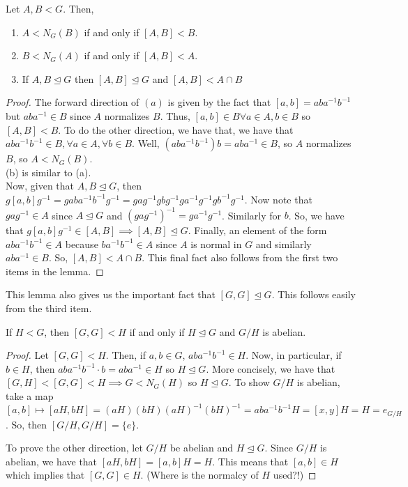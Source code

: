 \documentclass[11pt,leqno,oneside]{amsart}
\newcommand{\subgroup}{\mathrel{<}}
\newcommand{\normsubgroup}{\mathrel{\unlhd}}
\begin{document}
\begin{lem}
    Let $A,B \subgroup G$. Then,
    \begin{enumerate}[label=(\alph*)]
        \item $A \subgroup N_G(B)$ if and only if $[A,B] \subgroup B$.
        \item $B \subgroup N_G(A)$ if and only if $[A,B] \subgroup A$.
        \item If $A,B \normsubgroup G$ then $[A,B] \normsubgroup G$ and $[A,B]
            \subgroup A \cap B$
    \end{enumerate}
\end{lem}
\begin{proof}
    The forward direction of $(a)$ is given by the fact that $[a,b] =
    aba^{-1}b^{-1}$ but $aba^{-1} \in B$ since $A$ normalizes $B$. Thus, $[a,b]
    \in B \forall a \in A, b \in B$ so $[A,B] \subgroup B$. To do the other
    direction, we have that, we have that $aba^{-1}b^{-1} \in B, \forall a \in A,
    \forall b \in B$. Well, $(aba^{-1}b^{-1})b = aba^{-1} \in B$, so $A$
    normalizes $B$, so $A \subgroup N_G(B)$. \\

    (b) is similar to (a). \\

    Now, given that $A,B \normsubgroup G$, then $g[a,b]g^{-1} =
    gaba^{-1}b^{-1}g^{-1} = gag^{-1}gbg^{-1}ga^{-1}g^{-1}gb^{-1}g^{-1}$. Now
    note that $gag^{-1} \in A$ since $A \normsubgroup G$ and $(gag^{-1})^{-1} =
    ga^{-1}g^{-1}$. Similarly for $b$. So, we have that $g[a,b]g^{-1} \in [A,B]
    \implies [A,B] \normsubgroup G$. Finally, an element of the form
    $aba^{-1}b^{-1} \in A$ because $ba^{-1}b^{-1} \in A$ since $A$ is normal in
    $G$ and similarly $aba^{-1} \in B$. So, $[A,B] \subgroup A \cap B$. This
    final fact also follows from the first two items in the lemma.
\end{proof}

This lemma also gives us the important fact that $[G,G] \normsubgroup G$. This
follows easily from the third item.

\begin{prop}
    If $H \subgroup G$, then $[G,G] \subgroup H$ if and only if $H
    \normsubgroup G$ and $G/H$ is abelian.
\end{prop}
\begin{proof}
    Let $[G,G] \subgroup H$. Then, if $a,b \in G$, $aba^{-1}b^{-1} \in H$. Now,
    in particular, if $b \in H$, then $aba^{-1}b^{-1} \cdot b = aba^{-1} \in H$
    so $H \normsubgroup G$. More concisely, we have that $[G,H] \subgroup [G,G]
    \subgroup H \implies G \subgroup N_G(H)$ so $H \normsubgroup G$. To show
    $G/H$ is abelian, take a map $[a,b] \mapsto [aH,bH] =
    (aH)(bH)(aH)^{-1}(bH)^{-1} = aba^{-1}b^{-1}H = [x,y]H = H = e_{G/H}$. So,
    then $[G/H,G/H] = \{e\}$.

    To prove the other direction, let $G/H$ be abelian and $H \normsubgroup G$.
    Since $G/H$ is abelian, we have that $[aH,bH] = [a,b]H = H$. This means
    that $[a,b] \in H$ which implies that $[G,G] \in H$. (Where is the normalcy
    of $H$ used?!)
\end{proof}
\end{document}
